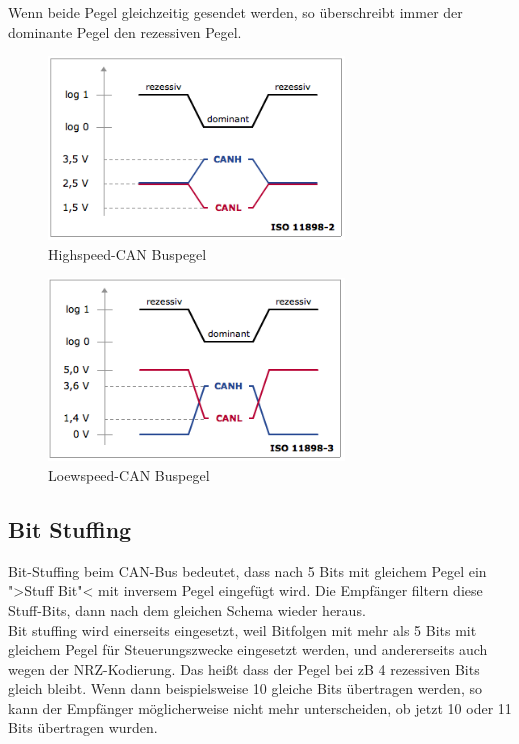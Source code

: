 Wenn beide Pegel gleichzeitig gesendet werden, so überschreibt immer
der dominante Pegel den rezessiven Pegel.

\begin{figure}[h] 
\centering
\includegraphics[width=0.7\textwidth]{figures/highcan}
\caption{Highspeed-CAN Buspegel \citep{VEC}} 
\label{data}
\end{figure} 

\begin{figure}[h] 
\centering
\includegraphics[width=0.7\textwidth]{figures/lowcan}
\caption{Loewspeed-CAN Buspegel \citep{VEC}} 
\label{data}
\end{figure} 
	
\subsection{Bit Stuffing} 
Bit-Stuffing beim CAN-Bus bedeutet, dass
nach 5 Bits mit gleichem Pegel ein ">Stuff Bit"< mit inversem Pegel
eingefügt wird. Die Empfänger filtern diese Stuff-Bits, dann nach dem
gleichen Schema wieder heraus.
\\ Bit stuffing wird einerseits
eingesetzt, weil Bitfolgen mit mehr als 5 Bits mit gleichem Pegel für
Steuerungszwecke eingesetzt werden, und andererseits auch wegen der
NRZ-Kodierung. Das heißt dass der Pegel bei zB 4 rezessiven Bits
gleich bleibt. Wenn dann beispielsweise 10 gleiche Bits übertragen
werden, so kann der Empfänger möglicherweise nicht mehr unterscheiden,
ob jetzt 10 oder 11 Bits übertragen wurden.
	
